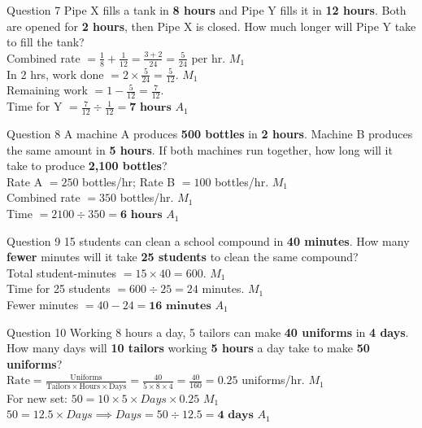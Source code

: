 \documentclass[12pt, a4paper, oneside]{article}
\begin{document}
\begin{solvingbox}{Question 7}
Pipe X fills a tank in \textbf{8 hours} and Pipe Y fills it in \textbf{12 hours}. Both are opened for \textbf{2 hours}, then Pipe X is closed. How much longer will Pipe Y take to fill the tank? \\
Combined rate $= \frac{1}{8} + \frac{1}{12} = \frac{3+2}{24} = \frac{5}{24}$ per hr. \hfill $M_1$ \\
In 2 hrs, work done $= 2 \times \frac{5}{24} = \frac{5}{12}$. \hfill $M_1$ \\
Remaining work $= 1 - \frac{5}{12} = \frac{7}{12}$. \\
Time for Y $= \frac{7}{12} \div \frac{1}{12} = \mathbf{7\text{ hours}}$ \hfill $A_1$
\end{solvingbox}

\begin{solvingbox}{Question 8}
A machine A produces \textbf{500 bottles} in \textbf{2 hours}. Machine B produces the same amount in \textbf{5 hours}. If both machines run together, how long will it take to produce \textbf{2,100 bottles}? \\
Rate A $= 250$ bottles/hr; Rate B $= 100$ bottles/hr. \hfill $M_1$ \\
Combined rate $= 350$ bottles/hr. \hfill $M_1$ \\
Time $= 2100 \div 350 = \mathbf{6\text{ hours}}$ \hfill $A_1$
\end{solvingbox}

\begin{solvingbox}{Question 9}
15 students can clean a school compound in \textbf{40 minutes}. How many \textbf{fewer} minutes will it take \textbf{25 students} to clean the same compound? \\
Total student-minutes $= 15 \times 40 = 600$. \hfill $M_1$ \\
Time for 25 students $= 600 \div 25 = 24$ minutes. \hfill $M_1$ \\
Fewer minutes $= 40 - 24 = \mathbf{16\text{ minutes}}$ \hfill $A_1$
\end{solvingbox}

\begin{solvingbox}{Question 10}
Working 8 hours a day, 5 tailors can make \textbf{40 uniforms} in \textbf{4 days}. How many days will \textbf{10 tailors} working \textbf{5 hours} a day take to make \textbf{50 uniforms}? \\
$\text{Rate} = \frac{\text{Uniforms}}{\text{Tailors} \times \text{Hours} \times \text{Days}} = \frac{40}{5 \times 8 \times 4} = \frac{40}{160} = 0.25$ uniforms/hr. \hfill $M_1$ \\
For new set: $50 = 10 \times 5 \times Days \times 0.25$ \hfill $M_1$ \\
$50 = 12.5 \times Days \implies Days = 50 \div 12.5 = \mathbf{4\text{ days}}$ \hfill $A_1$
\end{solvingbox}
\end{document}
